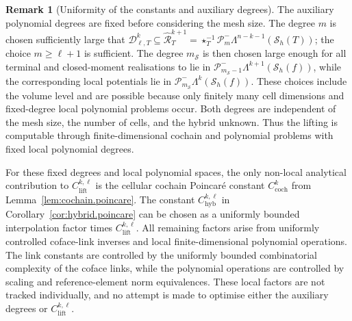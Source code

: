 \documentclass[a4paper,11pt]{article}
\theoremstyle{definition}
\newtheorem{remark}[theorem]{Remark}
\newcommand{\Sh}{\mathcal{S}_h}
\newcommand{\PLtrim}[2]{\mathcal{P}_{#1}^{-}\Lambda^{#2}}
\newcommand{\Dpoly}[2]{\mathcal D_{\ell,#1}^{#2}}
\begin{document}
\begin{remark}[Uniformity of the constants and auxiliary degrees]
\label{rem:uniformity.constants.degrees}
The auxiliary polynomial degrees are fixed before considering the mesh size.
The degree $m$ is chosen sufficiently large that $\Dpoly{T}{k}\subseteq\widehat{\mathcal R}_T^{k+1}=\star_T^{-1}\PLtrim{m}{n-k-1}(\Sh(T))$; the choice $m\geq\ell+1$ is sufficient.
The degree $m_{\mathcal S}$ is then chosen large enough for all terminal and closed-moment realisations to lie in $\PLtrim{m_{\mathcal S}-1}{k+1}(\Sh(f))$, while the corresponding local potentials lie in $\PLtrim{m_{\mathcal S}}{k}(\Sh(f))$.
These choices include the volume level and are possible because only finitely many cell dimensions and fixed-degree local polynomial problems occur.
Both degrees are independent of the mesh size, the number of cells, and the hybrid unknown.
Thus the lifting is computable through finite-dimensional cochain and polynomial problems with fixed local polynomial degrees.

For these fixed degrees and local polynomial spaces, the only non-local analytical contribution to $C_{\mathrm{lift}}^{k,\ell}$ is the cellular cochain Poincar\'e constant $C_{\mathrm{coch}}^k$ from Lemma~\ref{lem:cochain.poincare}.
The constant $C_{\mathrm{hyb}}^{k,\ell}$ in Corollary~\ref{cor:hybrid.poincare} can be chosen as a uniformly bounded interpolation factor times $C_{\mathrm{lift}}^{k,\ell}$.
All remaining factors arise from uniformly controlled coface-link inverses and local finite-dimensional polynomial operations.
The link constants are controlled by the uniformly bounded combinatorial complexity of the coface links, while the polynomial operations are controlled by scaling and reference-element norm equivalences.
These local factors are not tracked individually, and no attempt is made to optimise either the auxiliary degrees or $C_{\mathrm{lift}}^{k,\ell}$.
\end{remark}
\end{document}
